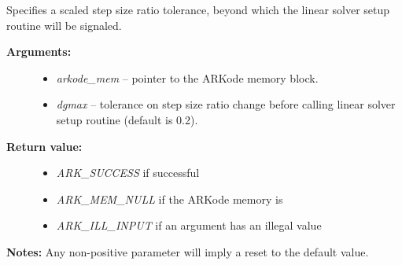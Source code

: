 \documentclass[letterpaper,10pt,english]{sphinxmanual}
\begin{document}
\begin{fulllineitems}
\label{c_interface/User_callable:c.ARKodeSetDeltaGammaMax}
Specifies a scaled step size ratio tolerance, beyond which the
linear solver setup routine will be signaled.
\begin{description}
\item[{\textbf{Arguments:}}] \leavevmode\begin{itemize}
\item {} 
\emph{arkode\_mem} -- pointer to the ARKode memory block.

\item {} 
\emph{dgmax} -- tolerance on step size ratio change before calling
linear solver setup routine (default is 0.2).

\end{itemize}

\item[{\textbf{Return value:}}] \leavevmode\begin{itemize}
\item {} 
\emph{ARK\_SUCCESS} if successful

\item {} 
\emph{ARK\_MEM\_NULL} if the ARKode memory is 

\item {} 
\emph{ARK\_ILL\_INPUT} if an argument has an illegal value

\end{itemize}

\end{description}

\textbf{Notes:}  Any non-positive parameter will imply a reset to the default value.

\end{fulllineitems}

\end{document}
